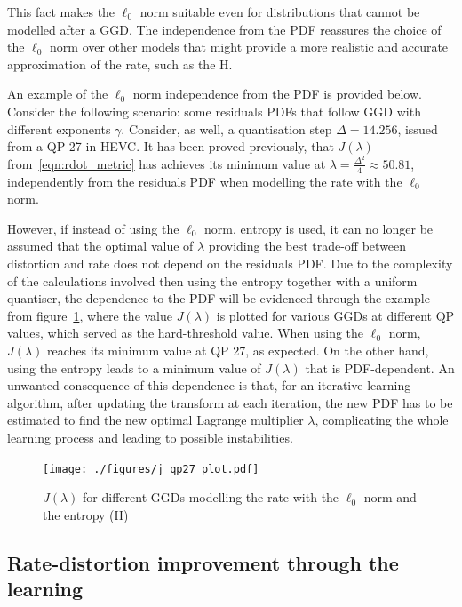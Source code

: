\documentclass[11pt,a4paper,openright,twoside]{book}
\numberwithin{equation}{section} %
\numberwithin{figure}{section} %
\numberwithin{table}{section} %
\begin{document}
This fact makes the $\ell_0$ norm suitable even for distributions
that cannot be modelled after a \ac{GGD}.
The independence from the \ac{PDF} reassures the choice of the $\ell_0$
norm over other models that might provide a more realistic and accurate
approximation of the rate, such as the \ac{H}.

An example of the $\ell_0$ norm independence from the \ac{PDF} is provided
below.
Consider the following scenario: some residuals \acp{PDF} that follow
\ac{GGD} with different exponents $\gamma$.
Consider, as well, a quantisation step $\Delta=14.256$, issued from a
\ac{QP} 27 in \ac{HEVC}.
It has been proved previously, that $J(\lambda)$
from~\eqref{eqn:rdot_metric} has achieves its minimum value at
$\lambda=\frac{\Delta^2}{4}\approx50.81$, independently from the
residuals \ac{PDF} when modelling the rate with the $\ell_0$ norm.

However, if instead of using the $\ell_0$ norm, entropy is used, it can
no longer be assumed that the optimal value of $\lambda$ providing the
best trade-off between distortion and rate does not depend on the
residuals \ac{PDF}.
Due to the complexity of the calculations involved then using the
entropy together with a uniform quantiser, the dependence to the
\ac{PDF} will be evidenced through the example from
figure~\ref{fig:j_lambda_qp}, where the value $J(\lambda)$ is plotted
for various \acp{GGD} at different \ac{QP} values, which served as the
hard-threshold value.
When using the $\ell_0$ norm, $J(\lambda)$ reaches its minimum value at
QP 27, as expected.
On the other hand, using the entropy leads to a minimum value of
$J(\lambda)$ that is \ac{PDF}-dependent.
An unwanted consequence of this dependence is that, for an iterative
learning algorithm, after updating the transform at each iteration, the
new \ac{PDF} has to be estimated to find the new optimal Lagrange
multiplier $\lambda$, complicating the whole learning process and
leading to possible instabilities.
\begin{figure}[tp]
	\centering
	\texttt{[image: ./figures/j\_qp27\_plot.pdf]}
	\caption{$J(\lambda)$ for different \acsp{GGD} modelling the rate with
	the $\ell_0$ norm and the entropy (H)}
	\label{fig:j_lambda_qp}
\end{figure}

\subsection{Rate-distortion improvement through the learning}
\label{sub:rate_distortion_improvement_through_the_learning}
\end{document}
